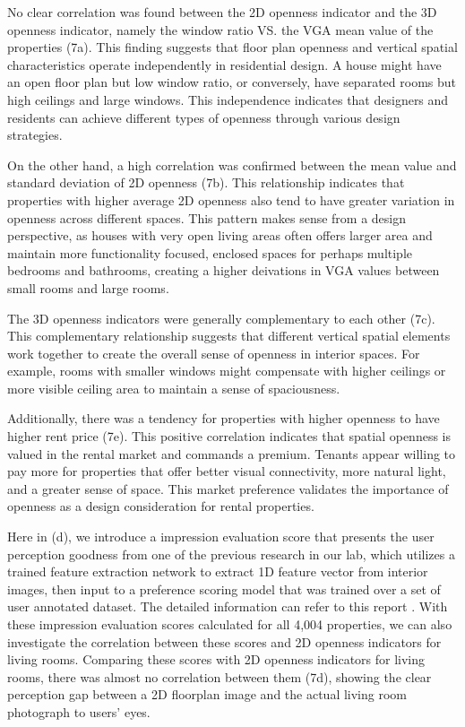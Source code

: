 No clear correlation was found between the 2D openness indicator and the 3D openness indicator, namely the window ratio VS.
the VGA mean value of the properties (7a). This finding suggests that floor plan openness and vertical spatial characteristics 
operate independently in residential design. A house might have an open floor plan but low window ratio, 
or conversely, have separated rooms but high ceilings and large windows. This independence indicates 
that designers and residents can achieve different types of openness through various design 
strategies.

On the other hand, a high correlation was confirmed between the mean value and standard deviation of 
2D openness (7b). This relationship indicates that properties with higher average 2D openness 
also tend to have greater variation in openness across different spaces. This pattern makes sense 
from a design perspective, as houses with very open living areas often offers larger area and maintain more functionality focused, 
enclosed spaces for perhaps multiple bedrooms and bathrooms, creating a higher deivations in VGA values between small rooms
and large rooms.

The 3D openness indicators were generally complementary to each other (7c). This 
complementary relationship suggests that different vertical spatial elements work together to create 
the overall sense of openness in interior spaces. For example, rooms with smaller windows might 
compensate with higher ceilings or more visible ceiling area to maintain a sense of spaciousness.

Additionally, there was a tendency for properties with higher openness to have higher rent price (7e). 
This positive correlation indicates that spatial openness is valued in the rental market and 
commands a premium. Tenants appear willing to pay more for properties that offer better visual 
connectivity, more natural light, and a greater sense of space. This market preference validates the 
importance of openness as a design consideration for rental properties.

Here in (d), we introduce a impression evaluation score that presents the user perception goodness from one of the 
previous research in our lab, which utilizes a trained feature extraction network to extract 1D feature 
vector from interior images, then input to a preference scoring model that was trained over a set of user annotated dataset. 
The detailed information can refer to this report \cite{oki2023rental}. With these impression evaluation scores calculated for all 4,004 
properties, we can also investigate the correlation between these scores and 2D openness indicators for living rooms. 
Comparing these scores with 2D openness indicators for living rooms, there was almost no correlation between them (7d), showing
the clear perception gap between a 2D floorplan image and the actual living room photograph to users' eyes. 

